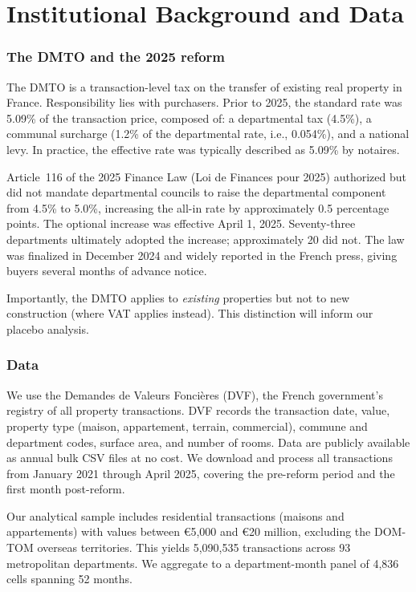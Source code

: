 \documentclass[12pt]{article}
\begin{document}
\section{Institutional Background and Data}

\subsubsection*{The DMTO and the 2025 reform}
The DMTO is a transaction-level tax on the transfer of existing real property in France.
Responsibility lies with purchasers. Prior to 2025, the standard rate was 5.09\% of the
transaction price, composed of: a departmental tax (4.5\%), a communal surcharge (1.2\%
of the departmental rate, i.e., 0.054\%), and a national levy. In practice, the effective
rate was typically described as 5.09\% by notaires.

Article~116 of the 2025 Finance Law (Loi de Finances pour 2025) authorized but did not mandate
departmental councils to raise the departmental component from 4.5\% to 5.0\%, increasing
the all-in rate by approximately 0.5 percentage points. The optional increase was effective
April 1, 2025. Seventy-three departments ultimately adopted the increase; approximately 20 did not.
The law was finalized in December 2024 and widely reported in the French press, giving buyers
several months of advance notice.

Importantly, the DMTO applies to \textit{existing} properties but not to new construction (where
VAT applies instead). This distinction will inform our placebo analysis.

\subsubsection*{Data}
We use the Demandes de Valeurs Fonci\`eres (DVF), the French government's registry of all property
transactions. DVF records the transaction date, value, property type (maison, appartement, terrain,
commercial), commune and department codes, surface area, and number of rooms. Data are publicly
available as annual bulk CSV files at no cost. We download and process all transactions from
January 2021 through April 2025, covering the pre-reform period and the first month post-reform.

Our analytical sample includes residential transactions (maisons and appartements) with values
between \euro{}5,000 and \euro{}20 million, excluding the DOM-TOM overseas territories. This
yields 5,090,535 transactions across 93 metropolitan departments. We aggregate to a
department-month panel of 4,836 cells spanning 52 months.
\end{document}
